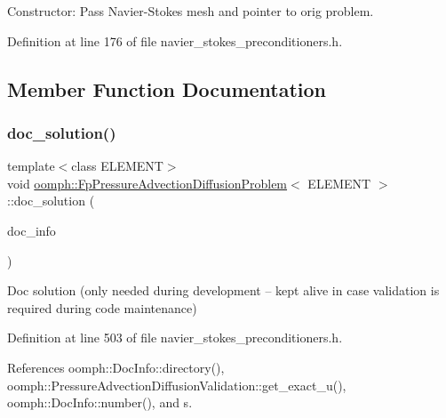 Constructor\+: Pass Navier-\/\+Stokes mesh and pointer to orig problem. 



Definition at line 176 of file navier\+\_\+stokes\+\_\+preconditioners.\+h.



\subsection{Member Function Documentation}
\mbox{\label{classoomph_1_1FpPressureAdvectionDiffusionProblem_aa58589dc1ce278655255588f0006b530}} 
\subsubsection{\texorpdfstring{doc\+\_\+solution()}{doc\_solution()}}
{\footnotesize\ttfamily template$<$class E\+L\+E\+M\+E\+NT$>$ \\
void \hyperlink{classoomph_1_1FpPressureAdvectionDiffusionProblem}{oomph\+::\+Fp\+Pressure\+Advection\+Diffusion\+Problem}$<$ E\+L\+E\+M\+E\+NT $>$\+::doc\+\_\+solution (\begin{DoxyParamCaption}\item[{\hyperlink{classoomph_1_1DocInfo}{Doc\+Info} \&}]{doc\+\_\+info }\end{DoxyParamCaption})\hspace{0.3cm}{\ttfamily [inline]}}



Doc solution (only needed during development -- kept alive in case validation is required during code maintenance) 



Definition at line 503 of file navier\+\_\+stokes\+\_\+preconditioners.\+h.



References oomph\+::\+Doc\+Info\+::directory(), oomph\+::\+Pressure\+Advection\+Diffusion\+Validation\+::get\+\_\+exact\+\_\+u(), oomph\+::\+Doc\+Info\+::number(), and s.

\mbox{\label{classoomph_1_1FpPressureAdvectionDiffusionProblem_a54b59cff41c3b0cca9524e202bd49453}} 
